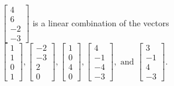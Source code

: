\begin{exercise}
\begin{exerciseStatement}
  \end{exerciseStatement}
  \begin{exerciseAnswer}
   \(\left[\begin{array}{c}
4 \\
6 \\
-2 \\
-3
\end{array}\right]\) 
  	 is  
	a linear combination of the vectors \(\left[\begin{array}{c}
1 \\
1 \\
0 \\
1
\end{array}\right] , \left[\begin{array}{c}
-2 \\
-3 \\
2 \\
0
\end{array}\right] , \left[\begin{array}{c}
1 \\
0 \\
4 \\
0
\end{array}\right] , \left[\begin{array}{c}
4 \\
-1 \\
-4 \\
-3
\end{array}\right] , \text{ and } \left[\begin{array}{c}
3 \\
-1 \\
4 \\
-3
\end{array}\right]\).

	
  


  \end{exerciseAnswer}
\end{exercise}